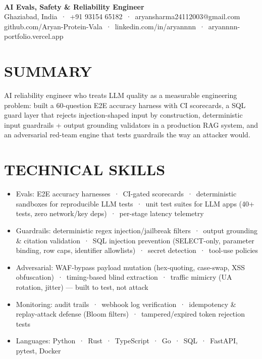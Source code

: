 \documentclass[9pt]{article}
\begin{document}
\\[3pt]
{\large\bfseries AI Evals, Safety \& Reliability Engineer}\\[3pt]
{\small\color{greyc} Ghaziabad, India \,·\, +91 93154 65182 \,·\, aryansharma24112003@gmail.com}\vspace{-2pt}
{\small\color{greyc} github.com/Aryan-Protein-Vala \,·\, linkedin.com/in/aryannnn \,·\, aryannnn-portfolio.vercel.app}\vspace{-2pt}
\section*{SUMMARY}
AI reliability engineer who treats LLM quality as a measurable engineering problem: built a 60-question E2E accuracy harness with CI scorecards, a SQL guard layer that rejects injection-shaped input by construction, deterministic input guardrails + output grounding validators in a production RAG system, and an adversarial red-team engine that tests guardrails the way an attacker would.
\vspace{1pt}
\section*{TECHNICAL SKILLS}
\begin{itemize}[leftmargin=11pt,itemsep=0pt,topsep=1pt,parsep=0pt]
\item Evals: E2E accuracy harnesses \,·\, CI-gated scorecards \,·\, deterministic sandboxes for reproducible LLM tests \,·\, unit test suites for LLM apps (40+ tests, zero network/key deps) \,·\, per-stage latency telemetry
\item Guardrails: deterministic regex injection/jailbreak filters \,·\, output grounding \& citation validation \,·\, SQL injection prevention (SELECT-only, parameter binding, row caps, identifier allowlists) \,·\, secret detection \,·\, tool-use policies
\item Adversarial: WAF-bypass payload mutation (hex-quoting, case-swap, XSS obfuscation) \,·\, timing-based blind extraction \,·\, traffic mimicry (UA rotation, jitter)  ---  built to test, not attack
\item Monitoring: audit trails \,·\, webhook log verification \,·\, idempotency \& replay-attack defense (Bloom filters) \,·\, tampered/expired token rejection tests
\item Languages: Python \,·\, Rust \,·\, TypeScript \,·\, Go \,·\, SQL \,·\, FastAPI, pytest, Docker
\end{itemize}
\end{document}
